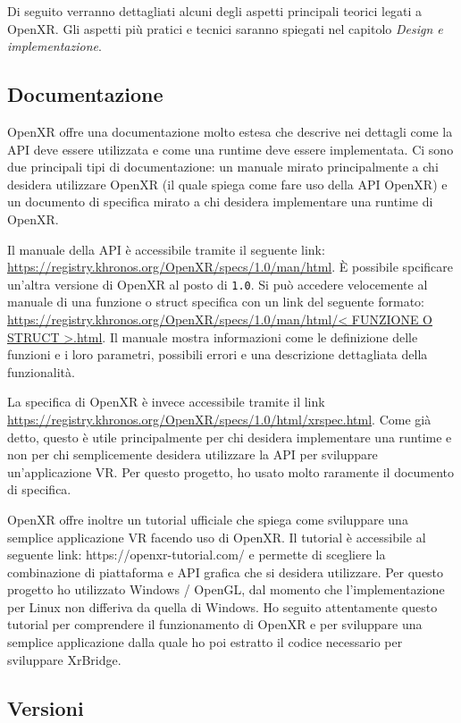 \documentclass[twoside]{supsistudent}
\begin{document}
Di seguito verranno dettagliati alcuni degli aspetti principali teorici legati a OpenXR. Gli aspetti più pratici e tecnici saranno spiegati nel capitolo \textit{Design e implementazione}.

\subsection{Documentazione}

OpenXR offre una documentazione molto estesa che descrive nei dettagli come la API deve essere utilizzata e come una runtime deve essere implementata. Ci sono due principali tipi di documentazione: un manuale mirato principalmente a chi desidera utilizzare OpenXR (il quale spiega come fare uso della API OpenXR) e un documento di specifica mirato a chi desidera implementare una runtime di OpenXR.

Il manuale della API è accessibile tramite il seguente link: \url{https://registry.khronos.org/OpenXR/specs/1.0/man/html}. È possibile spcificare un'altra versione di OpenXR al posto di \texttt{1.0}. Si può accedere velocemente al manuale di una funzione o struct specifica con un link del seguente formato: \url{https://registry.khronos.org/OpenXR/specs/1.0/man/html/< FUNZIONE O STRUCT >.html}. Il manuale mostra informazioni come le definizione delle funzioni e i loro parametri, possibili errori e una descrizione dettagliata della funzionalità.

La specifica di OpenXR è invece accessibile tramite il link \url{https://registry.khronos.org/OpenXR/specs/1.0/html/xrspec.html}. Come già detto, questo è utile principalmente per chi desidera implementare una runtime e non per chi semplicemente desidera utilizzare la API per sviluppare un'applicazione VR. Per questo progetto, ho usato molto raramente il documento di specifica.

OpenXR offre inoltre un tutorial ufficiale che spiega come sviluppare una semplice applicazione VR facendo uso di OpenXR. Il tutorial è accessibile al seguente link: https://openxr-tutorial.com/ e permette di scegliere la combinazione di piattaforma e API grafica che si desidera utilizzare. Per questo progetto ho utilizzato Windows / OpenGL, dal momento che l'implementazione per Linux non differiva da quella di Windows. Ho seguito attentamente questo tutorial per comprendere il funzionamento di OpenXR e per sviluppare una semplice applicazione dalla quale ho poi estratto il codice necessario per sviluppare XrBridge.

\subsection{Versioni}
\end{document}

